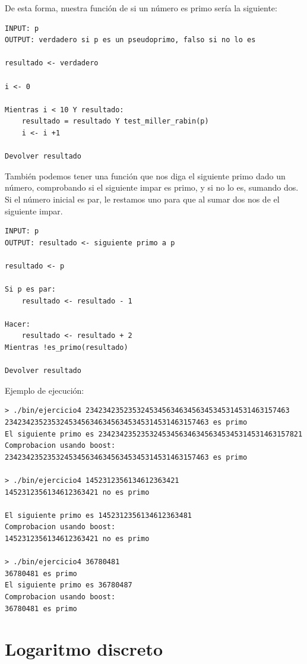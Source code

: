 \documentclass[12pt, spanish]{article}
\begin{document}
De esta forma, nuestra función de si un número es primo sería la siguiente:

\begin{lstlisting}[caption={Función para comprobar si un numero es primo}]
INPUT: p
OUTPUT: verdadero si p es un pseudoprimo, falso si no lo es

resultado <- verdadero

i <- 0

Mientras i < 10 Y resultado:
	resultado = resultado Y test_miller_rabin(p)
	i <- i +1

Devolver resultado
\end{lstlisting}

También podemos tener una función que nos diga el siguiente primo dado un número, comprobando si el siguiente impar es primo, y si no lo es, sumando dos. Si el número inicial es par, le restamos uno para que al sumar dos nos de el siguiente impar.

\begin{lstlisting}[caption={Función para encontrar el siguiente primo}]
INPUT: p
OUTPUT: resultado <- siguiente primo a p

resultado <- p

Si p es par:
	resultado <- resultado - 1

Hacer:
	resultado <- resultado + 2
Mientras !es_primo(resultado)

Devolver resultado
\end{lstlisting}

Ejemplo de ejecución:

\begin{lstlisting}
> ./bin/ejercicio4 234234235235324534563463456345345314531463157463
234234235235324534563463456345345314531463157463 es primo
El siguiente primo es 234234235235324534563463456345345314531463157821
Comprobacion usando boost:
234234235235324534563463456345345314531463157463 es primo

> ./bin/ejercicio4 1452312356134612363421
1452312356134612363421 no es primo

El siguiente primo es 1452312356134612363481
Comprobacion usando boost:
1452312356134612363421 no es primo

> ./bin/ejercicio4 36780481
36780481 es primo
El siguiente primo es 36780487
Comprobacion usando boost:
36780481 es primo
\end{lstlisting}


\section{Logaritmo discreto}
\end{document}
